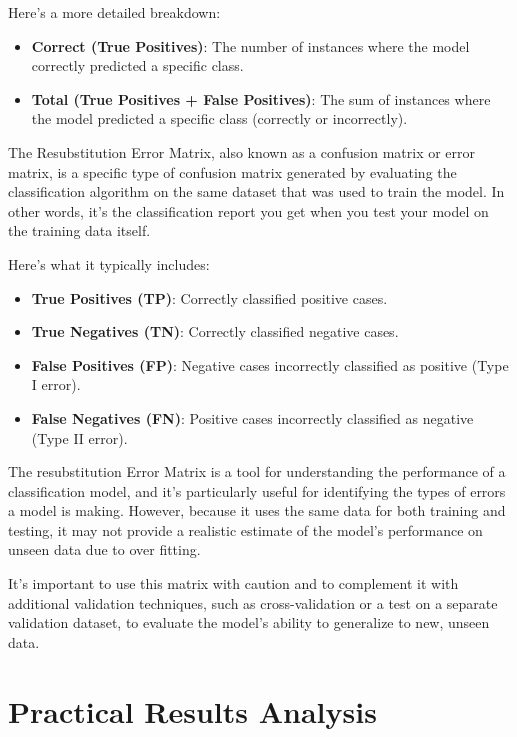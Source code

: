 \documentclass[
  letterpaper,
  DIV=11,
  numbers=noendperiod]{scrreprt}
\begin{document}
Here's a more detailed breakdown:

\begin{itemize}
\item
  \textbf{Correct (True Positives)}: The number of instances where the
  model correctly predicted a specific class.
\item
  \textbf{Total (True Positives + False Positives)}: The sum of
  instances where the model predicted a specific class (correctly or
  incorrectly).
\end{itemize}

The Resubstitution Error Matrix, also known as a confusion matrix or
error matrix, is a specific type of confusion matrix generated by
evaluating the classification algorithm on the same dataset that was
used to train the model. In other words, it's the classification report
you get when you test your model on the training data itself.

Here's what it typically includes:

\begin{itemize}
\item
  \textbf{True Positives (TP)}: Correctly classified positive cases.
\item
  \textbf{True Negatives (TN)}: Correctly classified negative cases.
\item
  \textbf{False Positives (FP)}: Negative cases incorrectly classified
  as positive (Type I error).
\item
  \textbf{False Negatives (FN)}: Positive cases incorrectly classified
  as negative (Type II error).
\end{itemize}

The resubstitution Error Matrix is a tool for understanding the
performance of a classification model, and it's particularly useful for
identifying the types of errors a model is making. However, because it
uses the same data for both training and testing, it may not provide a
realistic estimate of the model's performance on unseen data due to over
fitting.

It's important to use this matrix with caution and to complement it with
additional validation techniques, such as cross-validation or a test on
a separate validation dataset, to evaluate the model's ability to
generalize to new, unseen data.

\hypertarget{practical-results-analysis}{%
\section*{Practical Results Analysis}\label{practical-results-analysis}}
\end{document}
